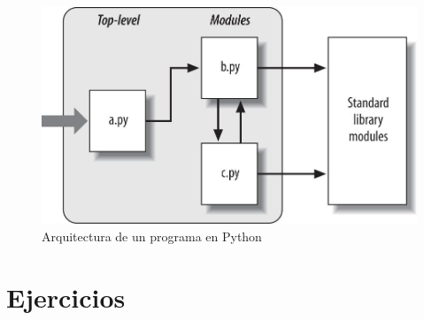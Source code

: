 \begin{figure}[ht!]
   \centering
   \includegraphics[scale=0.5]{imagenes/arquitectura_python.jpg}
   \caption{Arquitectura de un programa en Python}\label{graf:arquitectura-python}
\end{figure}

\newpage

\section{Ejercicios}

